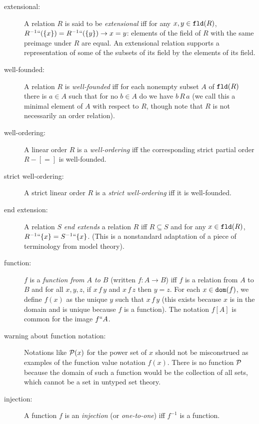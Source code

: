 \documentclass[12pt]{book}
\begin{document}
\begin{description}
\item[extensional:] A relation $R$ is said to be {\em extensional\/}
iff for any $x,y \in {\tt fld}(R)$,
$R^{-1}``(\{x\})=R^{-1}``(\{y\})\rightarrow x=y$: elements of the
field of $R$ with the same preimage under $R$ are equal.  An
extensional relation supports a representation of some of the subsets
of its field by the elements of its field.

\item[well-founded:] A relation $R$ is {\em well-founded\/} iff for each
nonempty subset $A$ of ${\tt fld}(R)$ there is $a\in A$ such that for
no $b\in A$ do we have $b \,R\,a$ (we call this a minimal element of
$A$ with respect to $R$, though note that $R$ is not necessarily an
order relation).

\item[well-ordering:] A linear order $R$ is a {\em well-ordering\/} iff the
corresponding strict partial order $R-[=]$ is well-founded.

\item[strict well-ordering:] A strict linear order $R$ is a {\em strict
well-ordering\/} iff it is well-founded.

\item[end extension:] A relation $S$ {\em end extends\/} a relation $R$
iff $R \subseteq S$ and for any $x \in {\tt fld}(R)$, $R^{-1}``\{x\} =
S^{-1}``\{x\}$.  (This is a nonstandard adaptation of a piece of
terminology from model theory).

\item[function:] $f$ is a {\em function from $A$ to $B$\/} (written
$f:A\rightarrow B$) iff $f$ is a relation from $A$ to $B$ and for all
$x,y,z$, if $x\,f\,y$ and $x\,f\,z$ then $y=z$.  For each $x\in {\tt
dom}(f)$, we define $f(x)$ as the unique $y$ such that $x\,f\,y$ (this
exists because $x$ is in the domain and is unique because $f$ is a
function).  The notation $f[A]$ is common for the image $f``A$.

\item[warning about function notation:] Notations like ${\cal P}(x)$
for the power set of $x$ should not be misconstrued as examples of the
function value notation $f(x)$.  There is no function $\cal P$ because
the domain of such a function would be the collection of all sets, which cannot be a set in untyped set theory.

\item[injection:] A function $f$ is an {\em injection\/} (or {\em one-to-one\/}) iff $f^{-1}$ is a
function.


\end{description}
\end{document}
